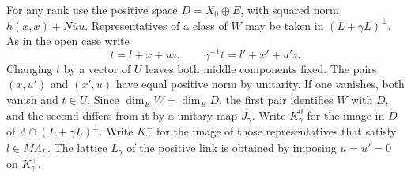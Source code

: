 \documentclass[a4paper,11pt]{article}
\theoremstyle{definition}
\theoremstyle{remark}
\numberwithin{equation}{section}
\begin{document}
For any rank use the positive space \(D=X_0\oplus E\), with
squared norm \(h(x,x)+N\bar u u\). Representatives of a class
of \(W\) may be taken in \((L+\gamma L)^\perp\). As in the open
case write
\[
 t=l+x+u z,\qquad \gamma^{-1}t=l'+x'+u'z .
\]
Changing \(t\) by a vector of \(U\) leaves both middle components
fixed. The pairs \((x,u')\) and \((x',u)\) have equal positive
norm by unitarity. If one vanishes, both vanish and \(t\in U\).
Since \(\dim_E W=\dim_E D\), the first pair identifies \(W\)
with \(D\), and the second differs from it by a unitary map
\(J_\gamma\). Write \(K_\gamma^0\) for the image in \(D\) of
\(\Lambda\cap(L+\gamma L)^\perp\). Write \(K_\gamma^+\) for the
image of those representatives that satisfy \(l\in M\Lambda_L\).
The lattice \(L_\gamma\) of the positive link is obtained by
imposing \(u=u'=0\) on \(K_\gamma^+\).
\end{document}
